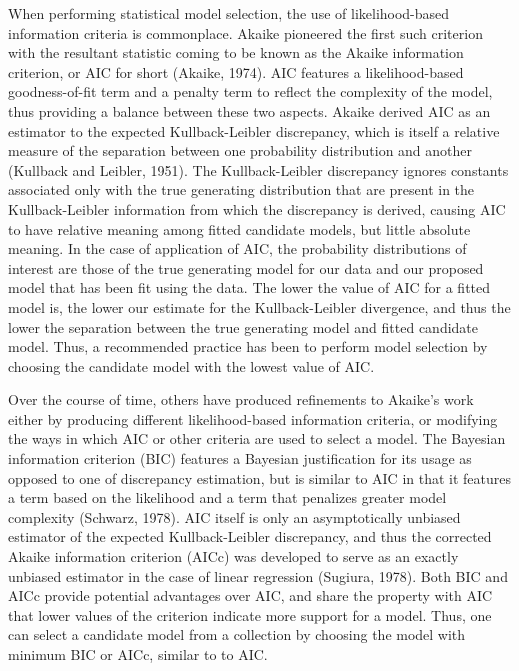 		When performing statistical model selection, the use of likelihood-based information criteria is commonplace. Akaike pioneered the first such criterion
		with the resultant statistic coming to be known as the Akaike information criterion, or AIC for short (Akaike, 1974). AIC features a likelihood-based goodness-of-fit term and a
		penalty term to reflect the complexity of the model, thus providing a balance between these two aspects. Akaike derived AIC as an estimator to the expected Kullback-Leibler discrepancy,
		which is itself a relative measure of the separation between one probability distribution and another (Kullback and Leibler, 1951). The Kullback-Leibler discrepancy ignores constants
		associated only with the true generating distribution that are present in the Kullback-Leibler information from which the discrepancy is derived, causing AIC to have relative meaning among
		fitted candidate models, but little absolute meaning. In the case of application of AIC, the probability distributions of interest are those of the true generating model
		for our data and our proposed model that has been fit using the data. The lower the value of AIC for a fitted model is, the lower our estimate for the Kullback-Leibler divergence,
		and thus the lower the separation between the true generating model and fitted candidate model. Thus, a recommended practice has been to perform model selection by choosing
		the candidate model with the lowest value of AIC.

		Over the course of time, others have produced refinements to Akaike's work either by producing different likelihood-based information criteria, or modifying the ways in which AIC or other
		criteria are used to select a model. The Bayesian information criterion (BIC) features a Bayesian justification for its usage as opposed to one of discrepancy estimation, but is similar to AIC in that
		it features a term based on the likelihood and a term that penalizes greater model complexity (Schwarz, 1978). AIC itself is only an asymptotically unbiased estimator of the expected Kullback-Leibler discrepancy,
		and thus the corrected Akaike information criterion (AICc) was developed to serve as an exactly unbiased estimator in the case of linear regression (Sugiura, 1978).
		Both BIC and AICc provide potential advantages over AIC, and share the property with AIC that lower values of the criterion indicate more support for a model. Thus, one can select a candidate model
		from a collection by choosing the model with minimum BIC or AICc, similar to to AIC.

